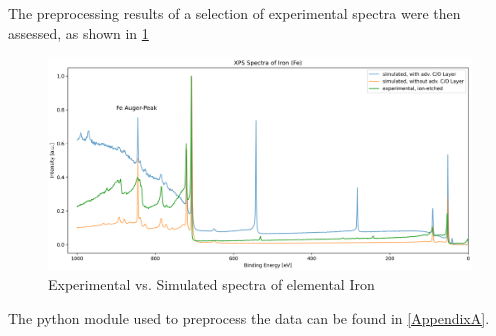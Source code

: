 The preprocessing results of a selection of experimental spectra were then assessed, as shown in \ref{fig:ex_vs_sim}

\begin{figure}
    \centering
    \includegraphics[width=\textwidth]{Figures/Fe_XPS.png}
    \caption{Experimental vs. Simulated spectra of elemental Iron}
    \label{fig:ex_vs_sim}
\end{figure}

The python module used to preprocess the data can be found in \ref{AppendixA}.